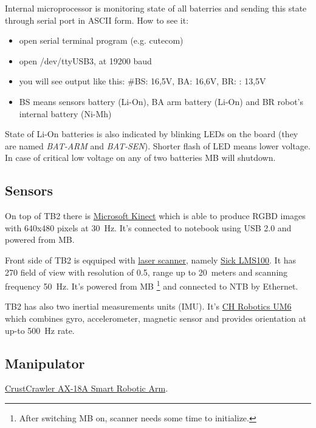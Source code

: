 \documentclass[12pt,a4paper,titlepage]{article}
\numberwithin{equation}{subsection}
\begin{document}
Internal microprocessor is monitoring state of all baterries and sending this state through serial port in ASCII form. How to see it:

\begin{itemize}
  \item{open serial terminal program (e.g. cutecom)}
  \item{open /dev/ttyUSB3, at 19200 baud}
  \item{you will see output like this: \#BS: 16,5V, BA: 16,6V, BR: : 13,5V}
  \item{BS means sensors battery (Li-On), BA arm battery (Li-On) and BR robot's internal battery (Ni-Mh)}
\end{itemize}

State of Li-On batteries is also indicated by blinking LEDs on the board (they are named \emph{BAT-ARM} and \emph{BAT-SEN}). Shorter flash of LED means lower voltage. In case of critical low voltage on any of two batteries MB will shutdown.

\subsection{Sensors}

On top of TB2 there is \href{http://en.wikipedia.org/wiki/Kinect}{Microsoft Kinect} which is able to produce RGBD images with 640x480 pixels at 30~Hz. It's connected to notebook using USB 2.0 and powered from MB.

Front side of TB2 is eqquiped with \href{http://en.wikipedia.org/wiki/LIDAR}{laser scanner}, namely \href{http://www.sick.com/us/en-us/home/products/product_news/laser_measurement_systems/Pages/lms100.aspx}{Sick LMS100}. It has 270\textdegree{} field of view with resolution of 0.5\textdegree{}, range up to 20~meters and scanning frequency 50~Hz. It's powered from MB \footnote{After switching MB on, scanner needs some time to initialize.} and connected to NTB by Ethernet.

TB2 has also two inertial measurements units (IMU). It's \href{http://www.chrobotics.com/docs/UM6_datasheet.pdf}{CH Robotics UM6} which combines gyro, accelerometer, magnetic sensor and provides orientation at up-to 500~Hz rate. 

\subsection{Manipulator}

\href{http://crustcrawler.com/products/AX-18F\%20Smart\%20Robotic\%20Arm/}{CrustCrawler AX-18A Smart Robotic Arm}.
\end{document}
